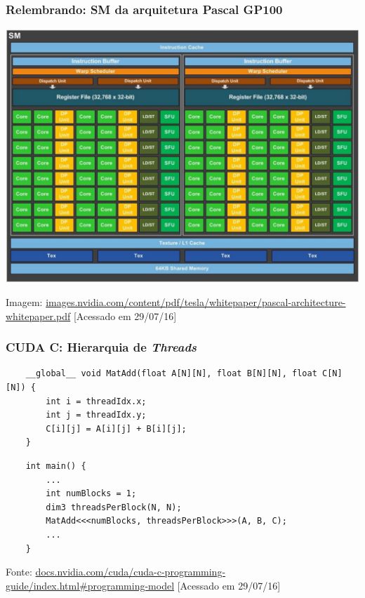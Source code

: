 \documentclass[10pt, compress]{beamer}
\begin{document}
\begin{frame}
    \frametitle{Relembrando: SM da arquitetura Pascal GP100}
    \centering
    \includegraphics[width=.9\textwidth]{gp100_SM_diagram}

    \vfill

    \tiny{Imagem: \url{images.nvidia.com/content/pdf/tesla/whitepaper/pascal-architecture-whitepaper.pdf} [Acessado em 29/07/16]}
\end{frame}

\begin{frame}[fragile]
    \frametitle{CUDA C: Hierarquia de \textit{Threads}}
    \begin{lstlisting}
    __global__ void MatAdd(float A[N][N], float B[N][N], float C[N][N]) {
        int i = threadIdx.x;
        int j = threadIdx.y;
        C[i][j] = A[i][j] + B[i][j];
    }
    \end{lstlisting}
    \pause
    \begin{lstlisting}
    int main() {
        ...
        int numBlocks = 1;
        dim3 threadsPerBlock(N, N);
        MatAdd<<<numBlocks, threadsPerBlock>>>(A, B, C);
        ...
    }
    \end{lstlisting}
    \vfill

    \begin{center}
        \tiny{Fonte: \url{docs.nvidia.com/cuda/cuda-c-programming-guide/index.html\#programming-model} [Acessado em 29/07/16]}
    \end{center}
\end{frame}
\end{document}
